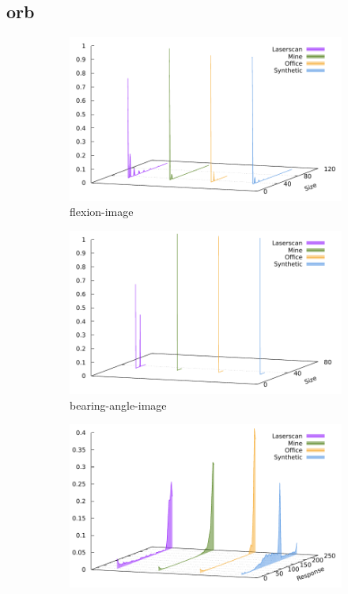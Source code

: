 \subsection{\acrshort{orb}}\label{sec:orb_stats}
\begin{figure}[H]
\begin{subfigure}[t]{0.45\linewidth}
    \includegraphics[width=\linewidth]{chapter06/results/ORB/flexion/size.pdf}%
    \caption{\gls{flexion-image}}
\end{subfigure}\quad
\begin{subfigure}[t]{0.45\linewidth}
    \includegraphics[width=\linewidth]{chapter06/results/ORB/bearing/size.pdf}
    \caption{\gls{bearing-angle-image}}
\end{subfigure}
\begin{subfigure}[t]{0.45\linewidth}
    \includegraphics[width=\linewidth]{chapter06/results/ORB/flexion/response.pdf}%

\end{subfigure}
\end{figure}
